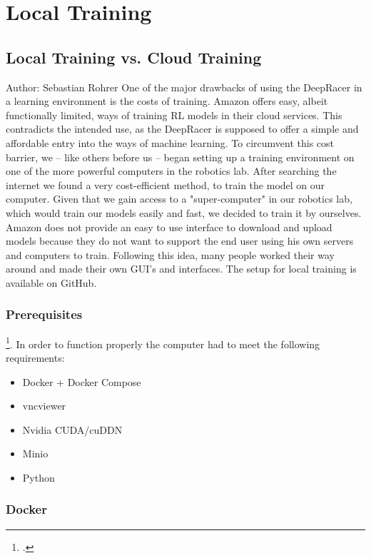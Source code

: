\chapter{Local Training}

\section{Local Training vs. Cloud Training}
Author: Sebastian Rohrer\newline
One of the major drawbacks of using the DeepRacer in a learning environment is the costs of training. Amazon offers easy, albeit functionally limited, ways of training RL models in their cloud services. This contradicts the intended use, as the DeepRacer is supposed to offer a simple and affordable entry into the ways of machine learning.
 To circumvent this cost barrier, we -- like others before us -- began setting up a training environment on one of the more powerful computers in the robotics lab. After searching the internet we found a very cost-efficient method, to train the model on our computer. Given that we gain access to a "super-computer" in our robotics lab, which would train our models easily and fast, we decided to train it by ourselves. Amazon does not provide an easy to use interface to download and upload models because they do not want to support the end user using his own servers and computers to train. Following this idea, many people worked their way around and made their own GUI's and interfaces.
 The setup for local training is available on GitHub. 

\subsection{Prerequisites}
\footcite{https://github.com/aws-deepracer-community/deepracer}. In order to function properly the computer had to meet the following requirements:

\begin{itemize}
 \item Docker + Docker Compose
 \item vncviewer 
 \item Nvidia CUDA/cuDDN 
 \item Minio
 \item Python
\end{itemize}

\subsection{Docker}

